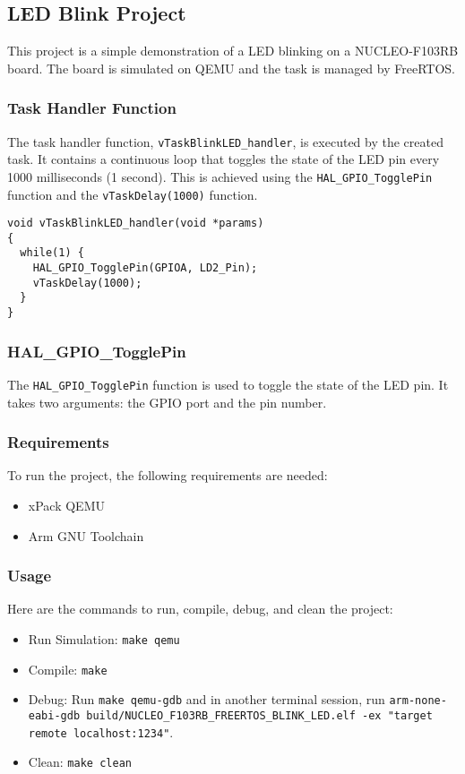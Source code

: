 \subsection{LED Blink Project}

This project is a simple demonstration of a LED blinking on a NUCLEO-F103RB board. The board is simulated on QEMU and the task is managed by FreeRTOS.

\subsubsection{Task Handler Function}

The task handler function, \texttt{vTaskBlinkLED\_handler}, is executed by the created task. It contains a continuous loop that toggles the state of the LED pin every 1000 milliseconds (1 second). This is achieved using the \texttt{HAL\_GPIO\_TogglePin} function and the \texttt{vTaskDelay(1000)} function.

\begin{verbatim}
void vTaskBlinkLED_handler(void *params)
{
  while(1) {
    HAL_GPIO_TogglePin(GPIOA, LD2_Pin);
    vTaskDelay(1000);
  }
}
\end{verbatim}

\subsubsection{HAL\_GPIO\_TogglePin}

The \texttt{HAL\_GPIO\_TogglePin} function is used to toggle the state of the LED pin. It takes two arguments: the GPIO port and the pin number.

\subsubsection{Requirements}

To run the project, the following requirements are needed:
\begin{itemize}
\item xPack QEMU
\item Arm GNU Toolchain
\end{itemize}

\subsubsection{Usage}

Here are the commands to run, compile, debug, and clean the project:

\begin{itemize}
\item Run Simulation: \texttt{make qemu}
\item Compile: \texttt{make}
\item Debug: Run \texttt{make qemu-gdb} and in another terminal session, run \texttt{arm-none-eabi-gdb build/NUCLEO\_F103RB\_FREERTOS\_BLINK\_LED.elf -ex "target remote localhost:1234"}.
\item Clean: \texttt{make clean}
\end{itemize}